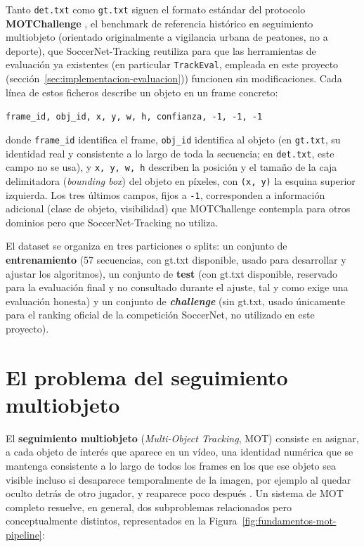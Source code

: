 Tanto \texttt{det.txt} como \texttt{gt.txt} siguen el formato estándar del
protocolo \textbf{MOTChallenge} \citep{motchallengeweb2026},
el benchmark de referencia histórico en seguimiento multiobjeto (orientado
originalmente a vigilancia urbana de peatones, no a deporte), que
SoccerNet-Tracking reutiliza para que las herramientas de evaluación ya
existentes (en particular \texttt{TrackEval}, empleada en este proyecto
(sección~\ref{sec:implementacion-evaluacion})) funcionen sin
modificaciones. Cada línea de estos ficheros describe un objeto en un frame
concreto:

\begin{center}
\texttt{frame\_id, obj\_id, x, y, w, h, confianza, -1, -1, -1}
\end{center}

donde \texttt{frame\_id} identifica el frame, \texttt{obj\_id} identifica
al objeto (en \texttt{gt.txt}, su identidad real y consistente a lo largo
de toda la secuencia; en \texttt{det.txt}, este campo no se usa), y
\texttt{x, y, w, h} describen la posición y el tamaño de la caja
delimitadora (\emph{bounding box}) del objeto en píxeles, con
\texttt{(x, y)} la esquina superior izquierda. Los tres últimos campos,
fijos a \texttt{-1}, corresponden a información adicional (clase de objeto,
visibilidad) que MOTChallenge contempla para otros dominios pero que
SoccerNet-Tracking no utiliza.

El dataset se organiza en tres particiones o splits: un conjunto de
\textbf{entrenamiento} (57 secuencias, con gt.txt disponible,
usado para desarrollar y ajustar los algoritmos), un conjunto de
\textbf{test} (con gt.txt disponible, reservado para la evaluación
final y no consultado durante el ajuste, tal y como exige una evaluación
honesta) y un conjunto de \emph{\textbf{challenge}} (sin gt.txt,
usado únicamente para el ranking oficial de la competición SoccerNet, no utilizado
 en este proyecto).

\section{El problema del seguimiento multiobjeto}
\label{sec:fundamentos-mot}

El \textbf{seguimiento multiobjeto} (\emph{Multi-Object Tracking}, MOT)
consiste en asignar, a cada objeto de interés que aparece en un vídeo, una
identidad numérica que se mantenga consistente a lo largo de todos los
frames en los que ese objeto sea visible incluso si desaparece
temporalmente de la imagen, por ejemplo al quedar oculto detrás de otro
jugador, y reaparece poco después \citep{ultralytics2026track}. Un sistema de MOT completo resuelve,
en general, dos subproblemas relacionados pero conceptualmente distintos,
representados en la Figura~\ref{fig:fundamentos-mot-pipeline}:

